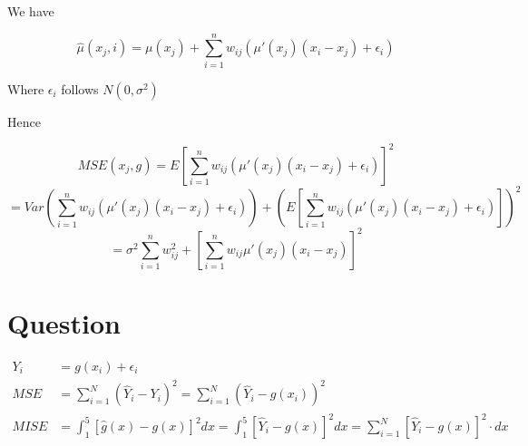 \documentclass{article}
\begin{document}
We have 

$$\hat{\mu}(x_j, i) = \mu(x_j) + \sum_{i = 1}^{n} w_{ij}(\mu'(x_j)(x_i-x_j) + \epsilon_i)  $$

Where $\epsilon_i$ follows $N(0, \sigma^2)$

Hence 

$$MSE(x_j,g) = E[\sum_{i = 1}^{n} w_{ij}(\mu'(x_j)(x_i-x_j) + \epsilon_i) ]^2$$
$$=Var(\sum_{i = 1}^{n} w_{ij}(\mu'(x_j)(x_i-x_j) + \epsilon_i)) + (E[\sum_{i = 1}^{n} w_{ij}(\mu'(x_j)(x_i-x_j) + \epsilon_i) ])^2$$
$$=\sigma^2\sum_{i=1}^n w_{ij}^2 + [\sum_{i=1}^n w_{ij}\mu'(x_j)(x_i-x_j)]^2$$



\section{Question}



\begin{align*}
    Y_i &= g(x_i)+\epsilon_i\\ 
    MSE &= \sum_{i=1}^N(\hat{Y}_i- Y_i)^2 = \sum_{i=1}^N(\hat{Y}_i- g(x_i))^2\\ 
    MISE &= \int_1^5[\hat{g}(x) - g(x)]^2dx =\int_1^5[\hat{Y}_i - g(x)]^2dx =  \sum_{i=1}^N[\hat{Y}_i - g(x)]^2\cdot dx
\end{align*}
\end{document}
